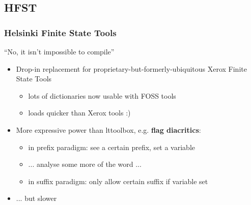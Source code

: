 \documentclass[notes=hide]{beamer}
\begin{document}
\subsection{HFST}
\begin{frame}\frametitle{Helsinki Finite State Tools}
  \begin{center}
    ``No, it isn't impossible to compile''
  \end{center}
  \begin{itemize}
  \item Drop-in replacement for proprietary-but-formerly-ubiquitous
    Xerox Finite State Tools
    \begin{itemize}
    \item lots of dictionaries now usable with FOSS tools
    \item loads quicker than Xerox tools :)
    \end{itemize}
  \end{itemize}

  \begin{itemize}
  \item More expressive power than lttoolbox, e.g. \textbf{flag
      diacritics}:
    \begin{itemize}
    \item in prefix paradigm: see a certain prefix, set a variable
    \item ... analyse some more of the word ...
    \item in suffix paradigm: only allow certain suffix if variable set
    \end{itemize}
  \item ... but slower          %
  \end{itemize}
\end{frame}
\end{document}

